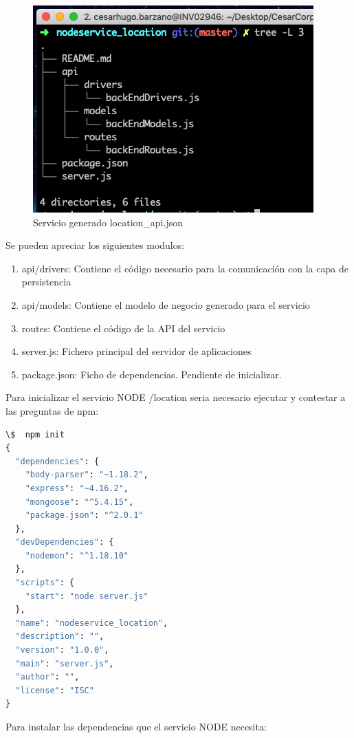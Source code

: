 \documentclass[a4paper,11pt]{book}
\begin{document}
\begin{figure}[H]  
\centering 
\includegraphics[scale=0.35]{imagenes/t22.png}
\caption{ Servicio generado location\_api.json}  
\end{figure}

Se pueden apreciar los siguientes modulos:

\begin{enumerate}
\item api/drivers: Contiene el código necesario para la comunicación con la capa de persistencia
\item api/models: Contiene el modelo de negocio generado para el servicio
\item routes: Contiene el código de la API del servicio
\item server.js: Fichero principal del servidor de aplicaciones
\item package.json: Ficho de dependencias. Pendiente de inicializar. 
\end{enumerate}


Para inicializar el servicio NODE  /location seria necesario ejecutar y contestar a las preguntas de npm: 

\begin{lstlisting}[language=python,caption={ Ejemplo inicialización /location }]
\$  npm init
{
  "dependencies": {
    "body-parser": "~1.18.2",
    "express": "~4.16.2",
    "mongoose": "^5.4.15",
    "package.json": "^2.0.1"
  },
  "devDependencies": {
    "nodemon": "^1.18.10"
  },
  "scripts": {
    "start": "node server.js"
  },
  "name": "nodeservice_location",
  "description": "",
  "version": "1.0.0",
  "main": "server.js",
  "author": "",
  "license": "ISC"
}
\end{lstlisting} 

Para instalar las dependencias que el servicio NODE necesita: 
\end{document}
